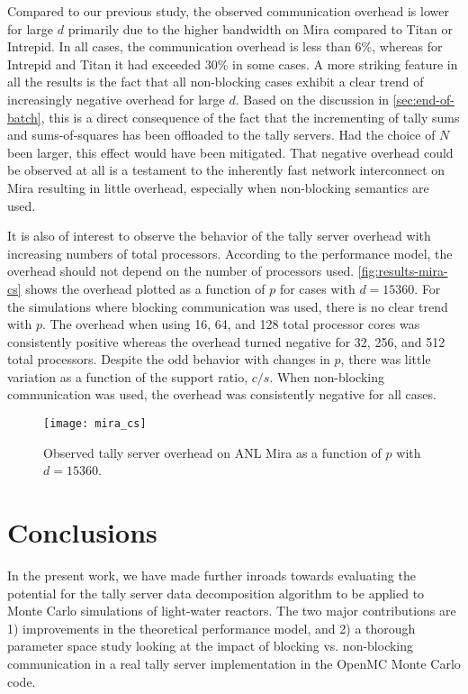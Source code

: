 \documentclass{snamc2013}
\begin{document}
Compared to our previous study, the observed communication overhead is lower for
large $d$ primarily due to the higher bandwidth on Mira compared to Titan or
Intrepid. In all cases, the communication overhead is less than 6\%, whereas for
Intrepid and Titan it had exceeded 30\% in some cases. A more striking feature
in all the results is the fact that all non-blocking cases exhibit a clear trend
of increasingly negative overhead for large $d$. Based on the discussion in
\autoref{sec:end-of-batch}, this is a direct consequence of the fact that the
incrementing of tally sums and sums-of-squares has been offloaded to the tally
servers. Had the choice of $N$ been larger, this effect would have been
mitigated. That negative overhead could be observed at all is a testament to the
inherently fast network interconnect on Mira resulting in little overhead,
especially when non-blocking semantics are used.

It is also of interest to observe the behavior of the tally server overhead with
increasing numbers of total processors. According to the performance model, the
overhead should not depend on the number of processors
used. \autoref{fig:results-mira-cs} shows the overhead plotted as a function of
$p$ for cases with $d=15360$. For the simulations where blocking communication
was used, there is no clear trend with $p$. The overhead when using 16, 64, and
128 total processor cores was consistently positive whereas the overhead turned
negative for 32, 256, and 512 total processors. Despite the odd behavior with
changes in $p$, there was little variation as a function of the support ratio,
$c/s$. When non-blocking communication was used, the overhead was consistently
negative for all cases.
\begin{figure}[htb]
  \centering
  \texttt{[image: mira\_cs]}
  \caption{Observed tally server overhead on ANL Mira as a function of $p$ with
    $d=15360$.}
  \label{fig:results-mira-cs}
\end{figure}

\section{Conclusions}

In the present work, we have made further inroads towards evaluating the
potential for the tally server data decomposition algorithm to be applied to
Monte Carlo simulations of light-water reactors. The two major contributions are
1) improvements in the theoretical performance model, and 2) a thorough
parameter space study looking at the impact of blocking vs. non-blocking
communication in a real tally server implementation in the OpenMC Monte Carlo
code.
\end{document}
